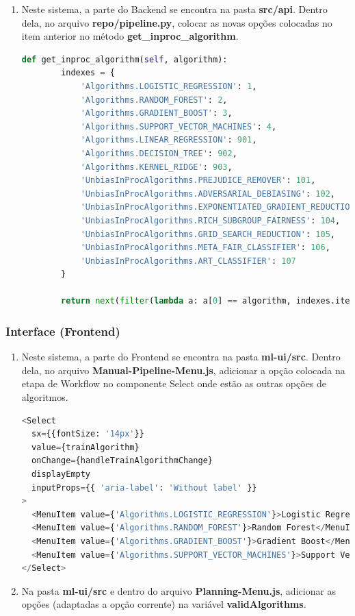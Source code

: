 \documentclass[Portugues,Final]{ic-tese-v3}
\begin{document}
\begin{enumerate}
\item Neste sistema, a parte do Backend se encontra na pasta \textbf{src/api}. Dentro dela, no arquivo \textbf{repo/pipeline.py}, colocar as novas opções colocadas no item anterior no método \textbf{get\_inproc\_algorithm}.

\begin{lstlisting}[language=Python, label=cod:getInprocAlgorithm]
    def get_inproc_algorithm(self, algorithm):
        indexes = {
            'Algorithms.LOGISTIC_REGRESSION': 1,
            'Algorithms.RANDOM_FOREST': 2,
            'Algorithms.GRADIENT_BOOST': 3,
            'Algorithms.SUPPORT_VECTOR_MACHINES': 4,
            'Algorithms.LINEAR_REGRESSION': 901,
            'Algorithms.DECISION_TREE': 902,
            'Algorithms.KERNEL_RIDGE': 903,
            'UnbiasInProcAlgorithms.PREJUDICE_REMOVER': 101,
            'UnbiasInProcAlgorithms.ADVERSARIAL_DEBIASING': 102,
            'UnbiasInProcAlgorithms.EXPONENTIATED_GRADIENT_REDUCTION': 103,
            'UnbiasInProcAlgorithms.RICH_SUBGROUP_FAIRNESS': 104,
            'UnbiasInProcAlgorithms.GRID_SEARCH_REDUCTION': 105,
            'UnbiasInProcAlgorithms.META_FAIR_CLASSIFIER': 106,
            'UnbiasInProcAlgorithms.ART_CLASSIFIER': 107
        }

        return next(filter(lambda a: a[0] == algorithm, indexes.items()))[1]
\end{lstlisting}
\end{enumerate}

\subsubsection{Interface (Frontend)}

\begin{enumerate}
\item Neste sistema, a parte do Frontend se encontra na pasta \textbf{ml-ui/src}. Dentro dela, no arquivo \textbf{Manual-Pipeline-Menu.js}, adicionar a opção colocada na etapa de Workflow no componente Select onde estão as outras opções de algoritmos.

\begin{lstlisting}[language=Python, label=cod:AddAlgorithmManual]
<Select
  sx={{fontSize: '14px'}}
  value={trainAlgorithm}
  onChange={handleTrainAlgorithmChange}
  displayEmpty
  inputProps={{ 'aria-label': 'Without label' }}
>
  <MenuItem value={'Algorithms.LOGISTIC_REGRESSION'}>Logistic Regression</MenuItem>
  <MenuItem value={'Algorithms.RANDOM_FOREST'}>Random Forest</MenuItem>
  <MenuItem value={'Algorithms.GRADIENT_BOOST'}>Gradient Boost</MenuItem>
  <MenuItem value={'Algorithms.SUPPORT_VECTOR_MACHINES'}>Support Vector Machines</MenuItem>
</Select>
\end{lstlisting}

\item Na pasta \textbf{ml-ui/src} e dentro do arquivo \textbf{Planning-Menu.js}, adicionar as opções (adaptadas a opção corrente) na variável \textbf{validAlgorithms}.
\end{enumerate}
\end{document}

